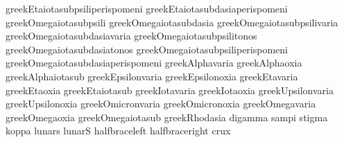  greekEtaiotasubpsiliperispomeni   {\greekpsiliperispomeni \greekEta \greekiota}
 greekEtaiotasubdasiaperispomeni   {\greekdasiaperispomeni \greekEta \greekiota}
 greekOmegaiotasubpsili            {\greekpsili \greekOmega \greekiota}
 greekOmegaiotasubdasia            {\greekdasia \greekOmega \greekiota}
 greekOmegaiotasubpsilivaria       {\greekpsilivaria \greekOmega \greekiota}
 greekOmegaiotasubdasiavaria       {\greekdasiavaria \greekOmega \greekiota}
 greekOmegaiotasubpsilitonos       {\greekpsilitonos \greekOmega \greekiota}
 greekOmegaiotasubdasiatonos       {\greekdasiatonos \greekOmega \greekiota}
 greekOmegaiotasubpsiliperispomeni {\greekpsiliperispomeni \greekOmega \greekiota}
 greekOmegaiotasubdasiaperispomeni {\greekdasiaperispomeni \greekOmega \greekiota}
 greekAlphavaria                   {\greekvaria \greekAlpha}
 greekAlphaoxia                    {\greekoxia \greekAlpha}
 greekAlphaiotasub                 {\greekAlpha \greekiota}
 greekEpsilonvaria                 {\greekvaria \greekEpsilon}
 greekEpsilonoxia                  {\greekoxia \greekEpsilon}
 greekEtavaria                     {\greekvaria \greekEta}
 greekEtaoxia                      {\greekoxia \greekEta}
 greekEtaiotasub                   {\greekEta \greekiota}
 greekIotavaria                    {\greekvaria \greekIota}
 greekIotaoxia                     {\greekoxia \greekIota}
 greekUpsilonvaria                 {\greekvaria \greekUpsilon}
 greekUpsilonoxia                  {\greekoxia \greekUpsilon}
 greekOmicronvaria                 {\greekvaria \greekOmicron}
 greekOmicronoxia                  {\greekoxia \greekOmicron}
 greekOmegavaria                   {\greekvaria \greekOmega}
 greekOmegaoxia                    {\greekoxia \greekOmega}
 greekOmegaiotasub                 {\greekOmega \greekiota}
 greekRhodasia                     {\greekdasia \greekRho}
 digamma                           {\greekdigamma}
 sampi                             {\greeksampi}
 stigma                            {\greekstigma}
 koppa                             {\greeknumkoppa}
 lunars                            {\greeksigmalunate}
 lunarS                            {\greekSigmalunate}
 halfbraceleft                     {\floorleft}
 halfbraceright                    {\floorright}
 crux                              {\textdag}

\stopencoding

\endinput
